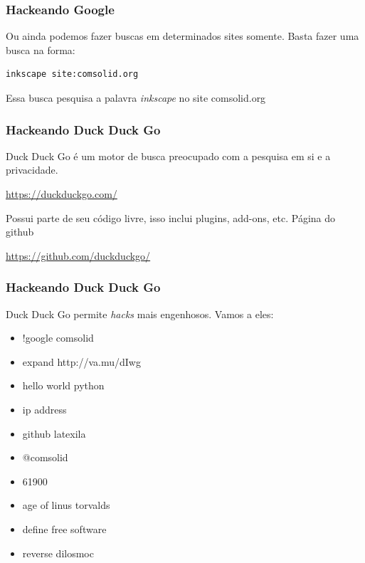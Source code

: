 \begin{frame}[fragile]\frametitle{Hackeando Google}

Ou ainda podemos fazer buscas em determinados sites somente. Basta fazer
uma busca na forma:

\begin{verbatim}
inkscape site:comsolid.org
\end{verbatim}
Essa busca pesquisa a palavra \emph{inkscape} no site comsolid.org

\end{frame}

\begin{frame}[fragile]\frametitle{Hackeando Duck Duck Go}

Duck Duck Go é um motor de busca preocupado com a pesquisa em si e a
privacidade.

\url{https://duckduckgo.com/}

Possui parte de seu código livre, isso inclui plugins, add-ons, etc.
Página do github

\url{https://github.com/duckduckgo/}

\end{frame}

\begin{frame}\frametitle{Hackeando Duck Duck Go}

Duck Duck Go permite \emph{hacks} mais engenhosos. Vamos a eles:

\begin{itemize}
\item
  !google comsolid
\item
  expand http://va.mu/dIwg
\item
  hello world python
\item
  ip address
\item
  github latexila
\item
  @comsolid
\item
  61900
\item
  age of linus torvalds
\item
  define free software
\item
  reverse dilosmoc
\end{itemize}
\end{frame}

